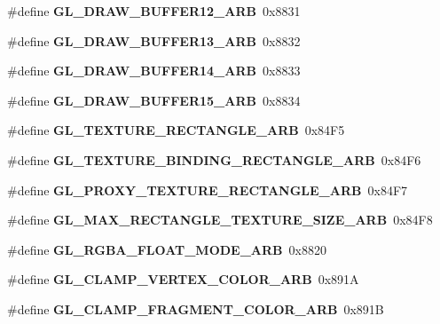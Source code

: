 \begin{DoxyCompactItemize}
\item 
\#define {\bfseries G\+L\+\_\+\+D\+R\+A\+W\+\_\+\+B\+U\+F\+F\+E\+R12\+\_\+\+A\+R\+B}~0x8831\label{_s_d_l__opengl_8h_a88906c0176518b245214111f46f17bd8}

\item 
\#define {\bfseries G\+L\+\_\+\+D\+R\+A\+W\+\_\+\+B\+U\+F\+F\+E\+R13\+\_\+\+A\+R\+B}~0x8832\label{_s_d_l__opengl_8h_ad1e81301c78a1adfc534ce22458fb2b8}

\item 
\#define {\bfseries G\+L\+\_\+\+D\+R\+A\+W\+\_\+\+B\+U\+F\+F\+E\+R14\+\_\+\+A\+R\+B}~0x8833\label{_s_d_l__opengl_8h_a2ff5021b971080bbc2a7d4821d8c0c55}

\item 
\#define {\bfseries G\+L\+\_\+\+D\+R\+A\+W\+\_\+\+B\+U\+F\+F\+E\+R15\+\_\+\+A\+R\+B}~0x8834\label{_s_d_l__opengl_8h_a6e19c237d02eb7cda494756bfc8d9dde}

\item 
\#define {\bfseries G\+L\+\_\+\+T\+E\+X\+T\+U\+R\+E\+\_\+\+R\+E\+C\+T\+A\+N\+G\+L\+E\+\_\+\+A\+R\+B}~0x84\+F5\label{_s_d_l__opengl_8h_ac429f0ea5d9d2f9ea349cf825b4cb769}

\item 
\#define {\bfseries G\+L\+\_\+\+T\+E\+X\+T\+U\+R\+E\+\_\+\+B\+I\+N\+D\+I\+N\+G\+\_\+\+R\+E\+C\+T\+A\+N\+G\+L\+E\+\_\+\+A\+R\+B}~0x84\+F6\label{_s_d_l__opengl_8h_ad2212067630c4de4d365b1cdca38e6a3}

\item 
\#define {\bfseries G\+L\+\_\+\+P\+R\+O\+X\+Y\+\_\+\+T\+E\+X\+T\+U\+R\+E\+\_\+\+R\+E\+C\+T\+A\+N\+G\+L\+E\+\_\+\+A\+R\+B}~0x84\+F7\label{_s_d_l__opengl_8h_a75556b084a48e5d09d481b49d33a01ac}

\item 
\#define {\bfseries G\+L\+\_\+\+M\+A\+X\+\_\+\+R\+E\+C\+T\+A\+N\+G\+L\+E\+\_\+\+T\+E\+X\+T\+U\+R\+E\+\_\+\+S\+I\+Z\+E\+\_\+\+A\+R\+B}~0x84\+F8\label{_s_d_l__opengl_8h_a1a990f79c906e2f5ecfd72bb915c6848}

\item 
\#define {\bfseries G\+L\+\_\+\+R\+G\+B\+A\+\_\+\+F\+L\+O\+A\+T\+\_\+\+M\+O\+D\+E\+\_\+\+A\+R\+B}~0x8820\label{_s_d_l__opengl_8h_a8c38f1b9248d4cc621903cf296d5be6a}

\item 
\#define {\bfseries G\+L\+\_\+\+C\+L\+A\+M\+P\+\_\+\+V\+E\+R\+T\+E\+X\+\_\+\+C\+O\+L\+O\+R\+\_\+\+A\+R\+B}~0x891\+A\label{_s_d_l__opengl_8h_a162101bb0d95733885e9a17320810892}

\item 
\#define {\bfseries G\+L\+\_\+\+C\+L\+A\+M\+P\+\_\+\+F\+R\+A\+G\+M\+E\+N\+T\+\_\+\+C\+O\+L\+O\+R\+\_\+\+A\+R\+B}~0x891\+B\label{_s_d_l__opengl_8h_a15588d12f81c584b38ca1eb1a3915842}


\end{DoxyCompactItemize}
